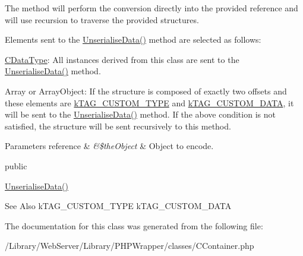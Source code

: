 The method will perform the conversion directly into the provided reference and will use recursion to traverse the provided structures.

Elements sent to the \hyperlink{class_c_container_a02b227658d1799d3608973312f67b28c}{Unserialise\-Data()} method are selected as follows\-:


\begin{DoxyItemize}
\item {\ttfamily \hyperlink{class_c_data_type}{C\-Data\-Type}}\-: All instances derived from this class are sent to the \hyperlink{class_c_container_a02b227658d1799d3608973312f67b28c}{Unserialise\-Data()} method. 
\item {\ttfamily Array} or {\ttfamily Array\-Object}\-: If the structure is composed of exactly two offsets and these elements are \hyperlink{}{k\-T\-A\-G\-\_\-\-C\-U\-S\-T\-O\-M\-\_\-\-T\-Y\-P\-E} and \hyperlink{}{k\-T\-A\-G\-\_\-\-C\-U\-S\-T\-O\-M\-\_\-\-D\-A\-T\-A}, it will be sent to the \hyperlink{class_c_container_a02b227658d1799d3608973312f67b28c}{Unserialise\-Data()} method. If the above condition is not satisfied, the structure will be sent recursively to this method. 
\end{DoxyItemize}


\begin{DoxyParams}[1]{Parameters}
reference & {\em \&\$the\-Object} & Object to encode.\\
\hline
\end{DoxyParams}
public

\hyperlink{class_c_container_a02b227658d1799d3608973312f67b28c}{Unserialise\-Data()}

\begin{DoxySeeAlso}{See Also}
k\-T\-A\-G\-\_\-\-C\-U\-S\-T\-O\-M\-\_\-\-T\-Y\-P\-E k\-T\-A\-G\-\_\-\-C\-U\-S\-T\-O\-M\-\_\-\-D\-A\-T\-A 
\end{DoxySeeAlso}


The documentation for this class was generated from the following file\-:\begin{DoxyCompactItemize}
\item 
/\-Library/\-Web\-Server/\-Library/\-P\-H\-P\-Wrapper/classes/C\-Container.\-php\end{DoxyCompactItemize}
